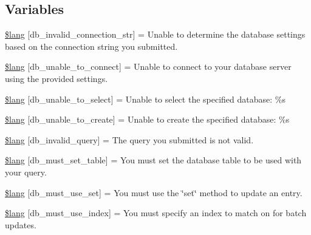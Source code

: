 \subsection*{Variables}
\begin{DoxyCompactItemize}
\item 
\hyperlink{db__lang_8php_a0c2ed2613101d37cbaba14042530c16d}{\$lang} \mbox{[}\textquotesingle{}db\+\_\+invalid\+\_\+connection\+\_\+str\textquotesingle{}\mbox{]} = \textquotesingle{}Unable to determine the database settings based on the connection string you submitted.\textquotesingle{}
\item 
\hyperlink{db__lang_8php_aa5935b86c957eb15ac7d41cf84143d66}{\$lang} \mbox{[}\textquotesingle{}db\+\_\+unable\+\_\+to\+\_\+connect\textquotesingle{}\mbox{]} = \textquotesingle{}Unable to connect to your database server using the provided settings.\textquotesingle{}
\item 
\hyperlink{db__lang_8php_a3c93974df838c0e036690874108715ea}{\$lang} \mbox{[}\textquotesingle{}db\+\_\+unable\+\_\+to\+\_\+select\textquotesingle{}\mbox{]} = \textquotesingle{}Unable to select the specified database\+: \%s\textquotesingle{}
\item 
\hyperlink{db__lang_8php_a4266e3b235feb16d9cf2e88afd1fedac}{\$lang} \mbox{[}\textquotesingle{}db\+\_\+unable\+\_\+to\+\_\+create\textquotesingle{}\mbox{]} = \textquotesingle{}Unable to create the specified database\+: \%s\textquotesingle{}
\item 
\hyperlink{db__lang_8php_a2cbf4ee929f45a29a0dcf21280bad485}{\$lang} \mbox{[}\textquotesingle{}db\+\_\+invalid\+\_\+query\textquotesingle{}\mbox{]} = \textquotesingle{}The query you submitted is not valid.\textquotesingle{}
\item 
\hyperlink{db__lang_8php_a0f5d469f071f2b5327b44761f4a06396}{\$lang} \mbox{[}\textquotesingle{}db\+\_\+must\+\_\+set\+\_\+table\textquotesingle{}\mbox{]} = \textquotesingle{}You must set the database table to be used with your query.\textquotesingle{}
\item 
\hyperlink{db__lang_8php_a55e22fb14cedc8ee7f70980bf7f37308}{\$lang} \mbox{[}\textquotesingle{}db\+\_\+must\+\_\+use\+\_\+set\textquotesingle{}\mbox{]} = \textquotesingle{}You must use the \char`\"{}set\char`\"{} method to update an entry.\textquotesingle{}
\item 
\hyperlink{db__lang_8php_a708419b6b94728c30474ee5fdde3b99b}{\$lang} \mbox{[}\textquotesingle{}db\+\_\+must\+\_\+use\+\_\+index\textquotesingle{}\mbox{]} = \textquotesingle{}You must specify an index to match on for batch updates.\textquotesingle{}

\end{DoxyCompactItemize}
